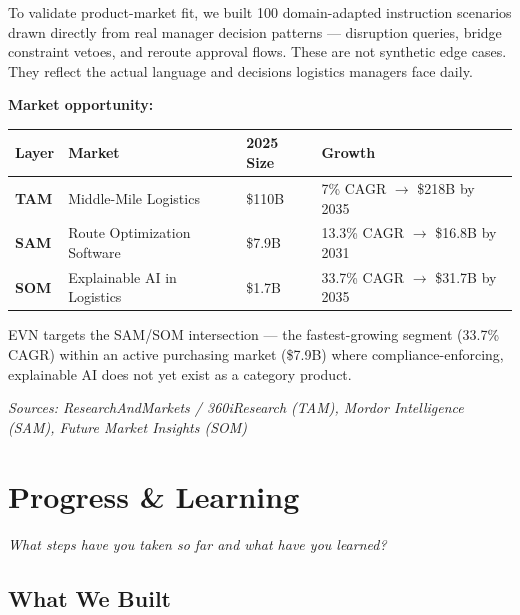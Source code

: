 \documentclass[11pt,letterpaper]{article}
\begin{document}
To validate product-market fit, we built 100 domain-adapted instruction scenarios drawn directly from real manager decision patterns --- disruption queries, bridge constraint vetoes, and reroute approval flows. These are not synthetic edge cases. They reflect the actual language and decisions logistics managers face daily.

\textbf{Market opportunity:}

\vspace{0.5em}
\begin{tabular}{@{}L{1.8cm}L{4.5cm}C{2.2cm}L{4.5cm}@{}}
    \toprule
    \textbf{Layer} & \textbf{Market} & \textbf{2025 Size} & \textbf{Growth} \\
    \midrule
    \textbf{TAM} & Middle-Mile Logistics & \$110B & 7\% CAGR $\to$ \$218B by 2035 \\[0.3em]
    \textbf{SAM} & Route Optimization Software & \$7.9B & 13.3\% CAGR $\to$ \$16.8B by 2031 \\[0.3em]
    \textbf{SOM} & Explainable AI in Logistics & \$1.7B & 33.7\% CAGR $\to$ \$31.7B by 2035 \\
    \bottomrule
\end{tabular}
\vspace{0.5em}

EVN targets the SAM/SOM intersection --- the fastest-growing segment (33.7\% CAGR) within an active purchasing market (\$7.9B) where compliance-enforcing, explainable AI does not yet exist as a category product.

\vspace{0.3em}
\textit{\small Sources: ResearchAndMarkets / 360iResearch (TAM), Mordor Intelligence (SAM), Future Market Insights (SOM)}

\section{Progress \& Learning}
\textit{What steps have you taken so far and what have you learned?}

\subsection*{What We Built}
\end{document}
